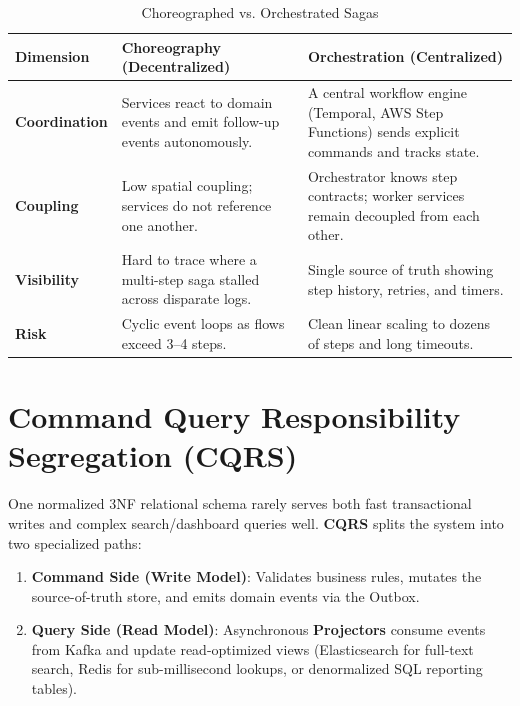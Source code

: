 \begin{table}[htbp]
\centering\small
\begin{tabular}{lp{5.5cm}p{5.5cm}}
\toprule
\textbf{Dimension} & \textbf{Choreography (Decentralized)} & \textbf{Orchestration (Centralized)} \\
\midrule
\textbf{Coordination} & Services react to domain events and emit follow-up events autonomously. & A central workflow engine (Temporal, AWS Step Functions) sends explicit commands and tracks state. \\
\textbf{Coupling} & Low spatial coupling; services do not reference one another. & Orchestrator knows step contracts; worker services remain decoupled from each other. \\
\textbf{Visibility} & Hard to trace where a multi-step saga stalled across disparate logs. & Single source of truth showing step history, retries, and timers. \\
\textbf{Risk} & Cyclic event loops as flows exceed 3--4 steps. & Clean linear scaling to dozens of steps and long timeouts. \\
\bottomrule
\end{tabular}
\caption{Choreographed vs. Orchestrated Sagas}
\label{tab:v4-ch08-saga-comparison}
\end{table}

\section{Command Query Responsibility Segregation (CQRS)}

One normalized 3NF relational schema rarely serves both fast transactional writes and complex search/dashboard queries well. \textbf{CQRS} splits the system into two specialized paths:
\begin{enumerate}[leftmargin=18pt]
  \item \textbf{Command Side (Write Model)}: Validates business rules, mutates the source-of-truth store, and emits domain events via the Outbox.
  \item \textbf{Query Side (Read Model)}: Asynchronous \textbf{Projectors} consume events from Kafka and update read-optimized views (Elasticsearch for full-text search, Redis for sub-millisecond lookups, or denormalized SQL reporting tables).
\end{enumerate}

